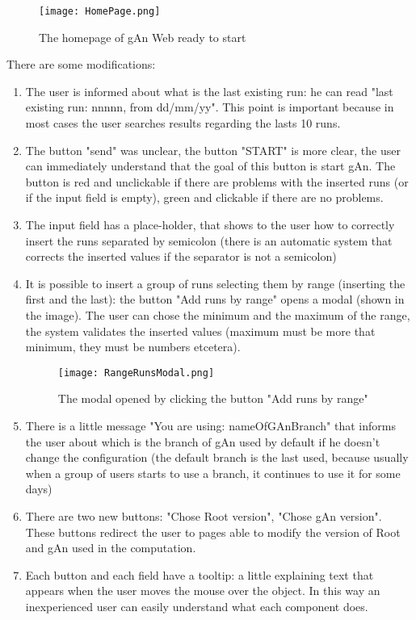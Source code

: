 \begin{figure}[H]
\centering
\texttt{[image: HomePage.png]} 
\caption{The homepage of gAn Web ready to start}
\end{figure}

There are some modifications:

\begin{enumerate}

\item The user is informed about what is the last existing run: he can read "last existing run: nnnnn, from dd/mm/yy". This point is important because in most cases the user searches results regarding the lasts 10 runs.

\item The button "send" was unclear, the button "START" is more clear, the user can immediately understand that the goal of this button is start gAn. The button is red and unclickable if there are problems with the inserted runs (or if the input field is empty), green and clickable if there are no problems.	 %

\item The input field has a place-holder, that shows to the user how to correctly insert the runs separated by semicolon (there is an automatic system that corrects the inserted values if the separator is not a semicolon)
 
\item It is possible to insert a group of runs selecting them by range (inserting the first and the last): the button "Add runs by range" opens a modal (shown in the image). The user can chose the minimum and the maximum of the range, the system validates the inserted values (maximum must be more that minimum, they must be numbers etcetera).

\begin{figure}[H]
\centering
\texttt{[image: RangeRunsModal.png]}  
\caption{The modal opened by clicking the button "Add runs by range"}
\end{figure}

\item There is a little message "You are using: nameOfGAnBranch" that informs the user about which is the branch of gAn used by default if he doesn't change the configuration (the default branch is the last used, because usually when a group of users starts to use a branch, it continues to use it for some days)

\item There are two new buttons: "Chose Root version", "Chose gAn version". These buttons redirect the user to pages able to modify the version of Root and gAn used in the computation.
 
\item Each button and each field have a tooltip: a little explaining text that appears when the user moves the mouse over the object. In this way an inexperienced user can easily understand what each component does.  

\end{enumerate}


